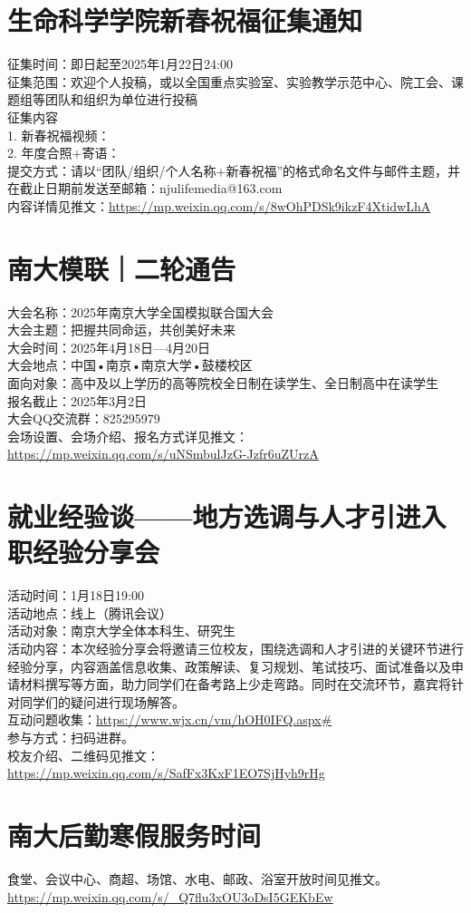 \documentclass[letterpaper, 12pt]{article}
\begin{document}
\begin{multicols}{2}
\section{生命科学学院新春祝福征集通知}
征集时间：即日起至2025年1月22日24:00\\
征集范围：欢迎个人投稿，或以全国重点实验室、实验教学示范中心、院工会、课题组等团队和组织为单位进行投稿\\
征集内容\\
1. 新春祝福视频：\\
2. 年度合照+寄语：\\
提交方式：请以“团队/组织/个人名称+新春祝福”的格式命名文件与邮件主题，并在截止日期前发送至邮箱：njulifemedia@163.com\\
内容详情见推文：\url{https://mp.weixin.qq.com/s/8wOhPDSk9ikzF4XtidwLhA}\\

\section{南大模联｜二轮通告}
大会名称：2025年南京大学全国模拟联合国大会\\
大会主题：把握共同命运，共创美好未来\\
大会时间：2025年4月18日—4月20日\\
大会地点：中国•南京•南京大学•鼓楼校区\\
面向对象：高中及以上学历的高等院校全日制在读学生、全日制高中在读学生\\
报名截止：2025年3月2日\\
大会QQ交流群：825295979\\
会场设置、会场介绍、报名方式详见推文：\url{https://mp.weixin.qq.com/s/uNSmbulJzG-Jzfr6uZUrzA}
\section{就业经验谈——地方选调与人才引进入职经验分享会}
活动时间：1月18日19:00\\
活动地点：线上（腾讯会议）\\
活动对象：南京大学全体本科生、研究生\\
活动内容：本次经验分享会将邀请三位校友，围绕选调和人才引进的关键环节进行经验分享，内容涵盖信息收集、政策解读、复习规划、笔试技巧、面试准备以及申请材料撰写等方面，助力同学们在备考路上少走弯路。同时在交流环节，嘉宾将针对同学们的疑问进行现场解答。\\
互动问题收集：\url{https://www.wjx.cn/vm/hOH0IFQ.aspx#}\\
参与方式：扫码进群。\\
校友介绍、二维码见推文：\url{https://mp.weixin.qq.com/s/SafFx3KxF1EO7SjHyh9rHg}
\section{南大后勤寒假服务时间}
食堂、会议中心、商超、场馆、水电、邮政、浴室开放时间见推文。\\
\url{https://mp.weixin.qq.com/s/_Q7flu3xOU3oDsI5GEKbEw}

\end{multicols} 
\end{document}
